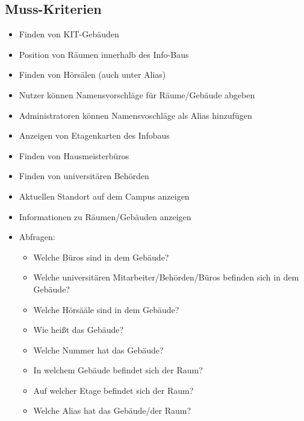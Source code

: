 \subsection{Muss-Kriterien}

\begin{itemize}

    \item Finden von KIT-Gebäuden
    \item Position von Räumen innerhalb des Info-Baus
    \item Finden von Hörsälen (auch unter Alias)
    \item Nutzer können Namensvorschläge für Räume/Gebäude abgeben
    \item Administratoren können Namensvoschläge als Alias hinzufügen
    \item Anzeigen von Etagenkarten des Infobaus
    \item Finden von Hausmeisterbüros
    \item Finden von universitären Behörden
    \item Aktuellen Standort auf dem Campus anzeigen
    \item Informationen zu Räumen/Gebäuden anzeigen
    \item Abfragen:
        \begin{itemize}
            \item Welche Büros sind in dem Gebäude?
            \item Welche universitären Mitarbeiter/Behörden/Büros befinden sich in dem Gebäude? 
            \item Welche Hörsääle sind in dem Gebäude?
            \item Wie heißt das Gebäude?
            \item Welche Nummer hat das Gebäude?
            \item In welchem Gebäude befindet sich der Raum?
            \item Auf welcher Etage befindet sich der Raum?
            \item Welche Alias hat das Gebäude/der Raum?
        \end{itemize}


\end{itemize}
